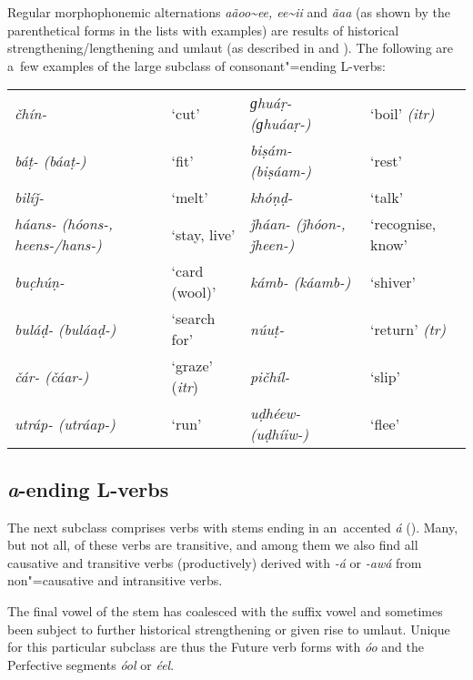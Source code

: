 Regular morphophonemic alternations \textit{aãoo\~{}ee, ee\~{}ii} and \textit{ãaa} (as shown by the parenthetical forms in the lists with examples) are results of historical strengthening/lengthening and umlaut (as described in  and ). The following are a~few examples of the large subclass of consonant"=ending L-verbs: 


\begin{table}[H]
\begin{tabularx}{\textwidth}{ Q Q Q Q }
\textit{čhín-} &
`cut' &
\textit{ɡhuáṛ- (ɡhuáaṛ-)} &
`boil' \textit{(itr)}\\
\textit{báṭ- (báaṭ-)} &
`fit' &
\textit{biṣám- (biṣáam-)} &
`rest'\\
\textit{bilíǰ-} &
`melt' &
\textit{khóṇḍ-} &
`talk'\\
\textit{háans- (hóons-, heens-/hans-)} &
`stay, live'
&
\textit{ǰháan- (ǰhóon-, ǰheen-)} &
`recognise, know'\\
\textit{buc̣húṇ-} &
`card (wool)' &
\textit{kámb- (káamb-)} &
`shiver'\\
\textit{buláḍ- (buláaḍ-)} &
`search for' &
\textit{núuṭ-} &
`return' \textit{(tr)}\\
\textit{čár- (čáar-)} &
`graze' (\textit{itr}) &
\textit{pičhíl-} &
`slip'\\
\textit{utráp- (utráap-)} &
`run' &
\textit{uḍhéew- (uḍhíiw-)} &
`flee'\\
\end{tabularx}
\end{table}


\subsection{\textit{a}-ending L-verbs}
\label{subsec:8-3-2}


The next subclass comprises verbs with stems ending in an~accented \textit{á} (). Many, but not all, of these verbs are transitive, and among them we also find all causative and transitive verbs (productively) derived with \textit{-á} or \textit{-awá} from non"=causative and intransitive verbs.


The final vowel of the stem has coalesced with the suffix vowel and sometimes been subject to further historical strengthening or given rise to umlaut. Unique for this particular subclass are thus the Future verb forms with \textit{óo} and the Perfective segments \textit{óol} or \textit{éel}. 


